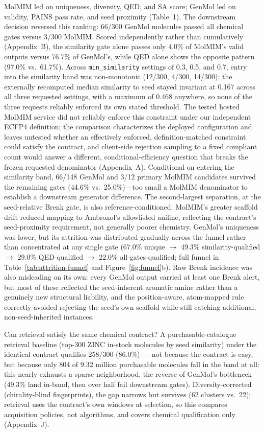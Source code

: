 \documentclass{article}
\begin{document}
MolMIM led on uniqueness, diversity, QED, and SA score; GenMol led on validity, PAINS pass rate, and seed proximity (Table~1). The downstream decision reversed this ranking: 66/300 GenMol molecules passed all chemical gates versus 3/300 MolMIM. Scored independently rather than cumulatively (Appendix~B), the similarity gate alone passes only 4.0\% of MolMIM's valid outputs versus 76.7\% of GenMol's, while QED alone shows the opposite pattern (97.0\% vs.\ 61.7\%). Across \texttt{min\_similarity} settings of 0.3, 0.5, and 0.7, entry into the similarity band was non-monotonic (12/300, 4/300, 14/300); the externally recomputed median similarity to seed stayed invariant at 0.167 across all three requested settings, with a maximum of 0.468 anywhere, so none of the three requests reliably enforced its own stated threshold. The tested hosted MolMIM service did not reliably enforce this constraint under our independent ECFP4 definition; the comparison characterizes the deployed configuration and leaves untested whether an effectively enforced, definition-matched constraint could satisfy the contract, and client-side rejection sampling to a fixed compliant count would answer a different, conditional-efficiency question that breaks the frozen requested denominator (Appendix~A). Conditional on entering the similarity band, 66/148 GenMol and 3/12 primary MolMIM candidates survived the remaining gates (44.6\% vs.\ 25.0\%)---too small a MolMIM denominator to establish a downstream generator difference. The second-largest separation, at the seed-relative Brenk gate, is also reference-conditioned: MolMIM's greater scaffold drift reduced mapping to Ambroxol's allowlisted aniline, reflecting the contract's seed-proximity requirement, not generally poorer chemistry. GenMol's uniqueness was lower, but its attrition was distributed gradually across the funnel rather than concentrated at any single gate (67.0\% unique $\to$ 49.3\% similarity-qualified $\to$ 29.0\% QED-qualified $\to$ 22.0\% all-gates-qualified; full funnel in Table~\ref{tab:attrition-funnel} and Figure~\ref{fig:funnel}b). Raw Brenk incidence was also misleading on its own: every GenMol output carried at least one Brenk alert, but most of these reflected the seed-inherent aromatic amine rather than a genuinely new structural liability, and the position-aware, atom-mapped rule correctly avoided rejecting the seed's own scaffold while still catching additional, non-seed-inherited instances.

Can retrieval satisfy the same chemical contract? A purchasable-catalogue retrieval baseline (top-300 ZINC in-stock molecules by seed similarity) under the identical contract qualifies 258/300 (86.0\%) --- not because the contract is easy, but because only 804 of 9.32 million purchasable molecules fall in the band at all: this nearly exhausts a sparse neighborhood, the reverse of GenMol's bottleneck (49.3\% land in-band, then over half fail downstream gates). Diversity-corrected (chirality-blind fingerprints), the gap narrows but survives (62 clusters vs.\ 22); retrieval uses the contract's own windows at selection, so this compares acquisition policies, not algorithms, and covers chemical qualification only (Appendix~J).
\end{document}
